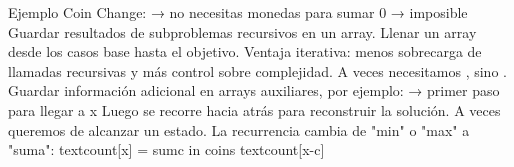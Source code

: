 \markdownRendererUlItem Ejemplo Coin Change:\markdownRendererInterblockSeparator
{}\markdownRendererUlBeginTight
\markdownRendererUlItem {} → no necesitas monedas para sumar 0\markdownRendererUlItemEnd 
\markdownRendererUlItem {} → imposible\markdownRendererUlItemEnd 
\markdownRendererUlEndTight \markdownRendererUlItemEnd 
\markdownRendererUlEndTight \markdownRendererInterblockSeparator
{}
\markdownRendererSectionEnd \markdownRendererSectionBegin
{}\markdownRendererInterblockSeparator
{}\markdownRendererUlBeginTight
\markdownRendererUlItem {} Guardar resultados de subproblemas recursivos en un array.\markdownRendererUlItemEnd 
\markdownRendererUlItem {} Llenar un array desde los casos base hasta el objetivo.\markdownRendererUlItemEnd 
\markdownRendererUlItem Ventaja iterativa: menos sobrecarga de llamadas recursivas y más control sobre complejidad.\markdownRendererUlItemEnd 
\markdownRendererUlEndTight \markdownRendererInterblockSeparator
{}
\markdownRendererSectionEnd \markdownRendererSectionBegin
{}\markdownRendererInterblockSeparator
{}\markdownRendererUlBeginTight
\markdownRendererUlItem A veces necesitamos , sino .\markdownRendererUlItemEnd 
\markdownRendererUlItem Guardar información adicional en arrays auxiliares, por ejemplo:\markdownRendererInterblockSeparator
{}\markdownRendererUlBeginTight
\markdownRendererUlItem {} → primer paso para llegar a x\markdownRendererUlItemEnd 
\markdownRendererUlEndTight \markdownRendererUlItemEnd 
\markdownRendererUlItem Luego se recorre hacia atrás para reconstruir la solución.\markdownRendererUlItemEnd 
\markdownRendererUlEndTight \markdownRendererInterblockSeparator
{}
\markdownRendererSectionEnd \markdownRendererSectionBegin
{}\markdownRendererInterblockSeparator
{}\markdownRendererUlBeginTight
\markdownRendererUlItem A veces queremos  de alcanzar un estado.\markdownRendererUlItemEnd 
\markdownRendererUlItem La recurrencia cambia de "min" o "max" a "suma":\markdownRendererSoftLineBreak
{}\markdownRendererDollarSign{}\markdownRendererDollarSign{}\markdownRendererSoftLineBreak
{}\markdownRendererBackslash{}text\markdownRendererLeftBrace{}count\markdownRendererRightBrace{}[x] = \markdownRendererBackslash{}sum\markdownRendererUnderscore{}\markdownRendererLeftBrace{}c \markdownRendererBackslash{}in coins\markdownRendererRightBrace{} \markdownRendererBackslash{}text\markdownRendererLeftBrace{}count\markdownRendererRightBrace{}[x-c]\markdownRendererSoftLineBreak
